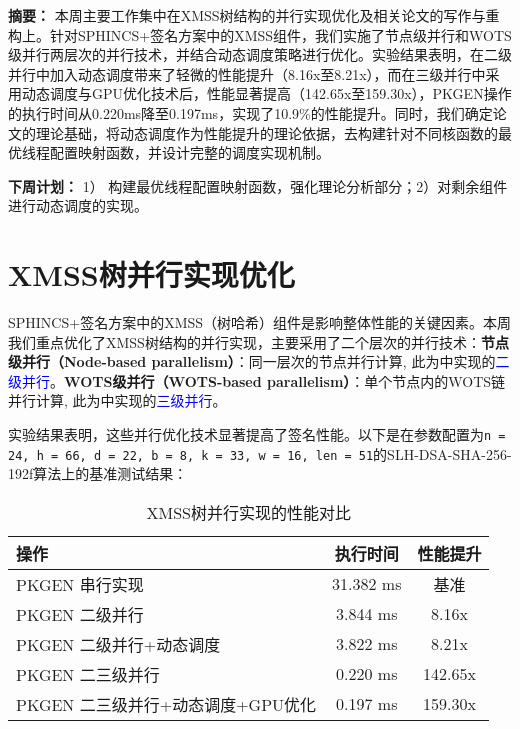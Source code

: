 \documentclass[report]{../../custom}
\begin{document}
\maketitle

\noindent \textbf{摘要：}
本周主要工作集中在XMSS树结构的并行实现优化及相关论文的写作与重构上。针对SPHINCS+签名方案中的XMSS组件，我们实施了节点级并行和WOTS级并行两层次的并行技术，并结合动态调度策略进行优化。实验结果表明，在二级并行中加入动态调度带来了轻微的性能提升（8.16x至8.21x），而在三级并行中采用动态调度与GPU优化技术后，性能显著提高（142.65x至159.30x），PKGEN操作的执行时间从0.220ms降至0.197ms，实现了10.9\%的性能提升。同时，我们确定论文的理论基础，将动态调度作为性能提升的理论依据，去构建针对不同核函数的最优线程配置映射函数，并设计完整的调度实现机制。

\vskip 0.5cm

\noindent \textbf{下周计划：} 1） 构建最优线程配置映射函数，强化理论分析部分；2）对剩余组件进行动态调度的实现。

\section{XMSS树并行实现优化}

SPHINCS+签名方案中的XMSS（树哈希）组件是影响整体性能的关键因素。本周我们重点优化了XMSS树结构的并行实现，主要采用了二个层次的并行技术：\textbf{节点级并行（Node-based parallelism）}：同一层次的节点并行计算, 此为\cite{Wang2025}中实现的\textcolor{blue}{二级并行}。\textbf{WOTS级并行（WOTS-based parallelism）}：单个节点内的WOTS链并行计算, 此为\cite{Wang2025}中实现的\textcolor{blue}{三级并行}。

实验结果表明，这些并行优化技术显著提高了签名性能。以下是在参数配置为\texttt{n = 24, h = 66, d = 22, b = 8, k = 33, w = 16, len = 51}的SLH-DSA-SHA-256-192f算法上的基准测试结果：

\begin{table}[ht]
  \centering
  \begin{tabular}{|l|c|c|}
    \hline
    \textbf{操作} & \textbf{执行时间} & \textbf{性能提升} \\
    \hline
    PKGEN 串行实现 \cite{Wang2025} & 31.382 ms & 基准 \\
    \hline
    PKGEN 二级并行 \cite{Wang2025} & 3.844 ms & 8.16x \\
    \hline
    PKGEN 二级并行+动态调度 & 3.822 ms & 8.21x \\
    \hline
    PKGEN 二三级并行 \cite{Wang2025} & 0.220 ms & 142.65x \\
    \hline
    PKGEN 二三级并行+动态调度+GPU优化 & 0.197 ms & 159.30x \\
    \hline
  \end{tabular}
  \caption{XMSS树并行实现的性能对比}
  \label{tab:xmss_performance}
\end{table}
\end{document}
